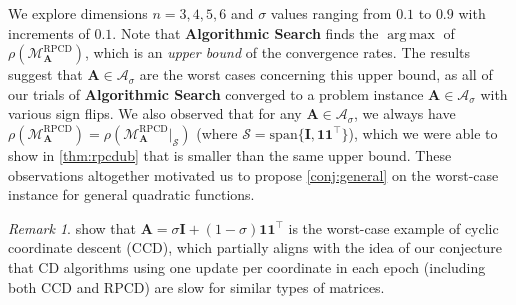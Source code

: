 \documentclass{article}
\theoremstyle{plain}
\theoremstyle{definition}
\theoremstyle{remark}
\newtheorem*{remark*}{Remark} %
\renewcommand{\sp}{\mathrm{span}}
\newcommand{\RPCD}{\text{RPCD}} %
\newcommand{\MARPCD}{\mathcal{M}_{\bm{A}}^{\RPCD}} %
\def\vone{{\bm{1}}}
\def\mA{{\bm{A}}}
\def\mI{{\bm{I}}}
\def\gA{{\mathcal{A}}}
\def\gS{{\mathcal{S}}}
\DeclareMathOperator*{\argmax}{arg\,max}
\begin{document}
We explore dimensions $n=3,4,5,6$ and $\sigma$ values ranging from $0.1$ to $0.9$ with increments of $0.1$.
Note that \textbf{Algorithmic Search} finds the $\argmax$ of $\rho(\MARPCD)$, which is an \emph{upper bound} of the convergence rates. The results suggest that $\mA \in \gA_{\sigma}$ are the worst cases concerning this upper bound, as all of our trials of \textbf{Algorithmic Search} converged to a problem instance $\mA \in \gA_{\sigma}$ with various sign flips.
We also observed that for any $\mA \in \gA_{\sigma}$, we always have $\rho(\MARPCD) = \rho(\MARPCD|_{\gS})$ (where $\gS = \sp \{ \mI, \vone \vone^{\top} \}$), which we were able to show in \cref{thm:rpcdub} that is smaller than the same upper bound.
These observations altogether motivated us to propose \cref{conj:general} on the worst-case instance for general quadratic functions.



\begin{remark*}
    \citet{sun16} show that $\mA = \sigma \mI + (1 - \sigma) \vone \vone^{\top}$ is the worst-case example of cyclic coordinate descent (CCD), which partially aligns with the idea of our conjecture that CD algorithms using one update per coordinate in each epoch (including both CCD and RPCD) are slow for similar types of matrices.
\end{remark*}
\end{document}
